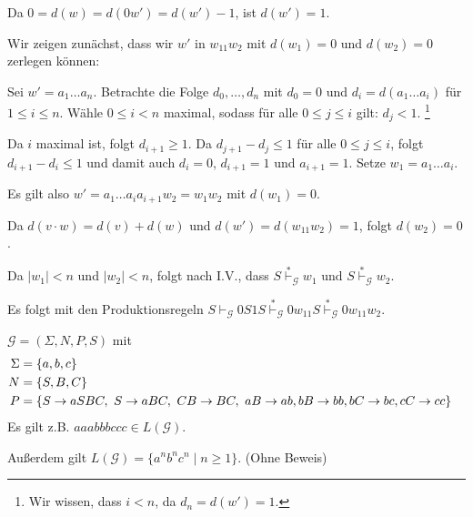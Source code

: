 \begin{Bsp}
\begin{description}[font=\normalfont]
  Da $0 = d(w) = d(0w') = d(w') - 1$, ist $d(w') = 1$.
  
  \medskip

  Wir zeigen zunächst, dass wir $w'$ in $w_11w_2$ mit $d(w_1) = 0$ und $d(w_2) = 0$ zerlegen können:

    Sei $w' = a_1 \ldots a_n$.
    Betrachte die Folge $d_0,\ldots,d_n$ mit $d_0 = 0$ und $d_i = d(a_1\ldots a_i)$ für $1 \le i \leq n$.
    Wähle $0 \le i < n$ maximal, sodass für alle $0 \le j \le i$ gilt: $d_j < 1$.%
    \footnote{Wir wissen, dass $i < n$, da $d_n = d(w') = 1$.}

    Da $i$ maximal ist, folgt $d_{i+1} \ge 1$.
    Da $d_{j+1} - d_j \le 1$ für alle $0 \le j \le i$, folgt $d_{i+1} - d_i \le 1$ und damit auch $d_i = 0$, $d_{i+1} = 1$ und $a_{i+1} = 1$.
    Setze $w_1 = a_1\ldots a_{i}$.

    Es gilt also $w' = a_1\ldots a_{i}a_{i+1}w_2 = w_1w_2$ mit $d(w_1) = 0$.

    Da $d(v \cdot w) = d(v) + d(w)$ und $d(w') = d(w_11w_2) = 1$, folgt $d(w_2) = 0$.
  \bigskip
  \goodbreak

  Da $|w_1| < n$ und $|w_2| < n$, folgt nach I.V., dass $S \stackrel{*}{\vdash}_{\mathcal{G}} w_1$ und $S \stackrel{*}{\vdash}_{\mathcal{G}} w_2$.

  Es folgt mit den Produktionsregeln $S \vdash_{\mathcal{G}} 0S1S \stackrel{*}{\vdash}_{\mathcal{G}} 0w_11S \stackrel{*}{\vdash}_{\mathcal{G}} 0w_11w_2$.
  \qedhere
\end{description}
\end{Bsp}

\begin{Bsp} $\mathcal{G}=(\Sigma,N,P,S)$ mit
	\begin{align*}
		\Sigma &= \{a,b,c\}\\
		N &= \{S,B,C\}\\
		P &= 
		\begin{aligned}[t]
			 \{ &S \-> aSBC,\ S\->aBC,\ CB\-> BC,\ aB\-> ab,
			bB\-> bb, bC\-> bc, cC\-> cc \}
		\end{aligned}
	\end{align*}
Es gilt z.B. $aaabbbccc\in L(\mathcal{G})$.

Außerdem gilt $L(\mathcal{G}) =  \{ a^nb^nc^n \mid n\geq 1 \}$. (Ohne Beweis)
\end{Bsp}

